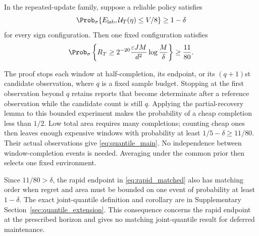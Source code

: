 \begin{theorem}
\label{thm:quantile_main}
In the repeated-update family, suppose a reliable policy satisfies
\[
 \Prob_\sigma\{E_{\rm lab},\mathcal U_T(\eta)\le V/8\}\ge1-\delta
\]
for every sign configuration. Then one fixed configuration satisfies
\begin{equation}
 \Prob_\sigma\left\{R_T\ge
 2^{-20}\frac{\varepsilon JM}{d^2}\log\frac M\delta\right\}
 \ge\frac{11}{80}.
 \label{eq:quantile_main}
\end{equation}
\end{theorem}

The proof stops each window at half-completion, its endpoint, or its
$(q+1)$st candidate observation, where $q$ is a fixed sample budget. Stopping
at the first observation beyond $q$ retains reports that become determinate
after a reference observation while the candidate count is still $q$.
Applying the partial-recovery lemma to this bounded experiment makes the
probability of a cheap completion less than $1/2$. Low total area requires
many completions; counting cheap ones then leaves enough expensive windows
with probability at least $1/5-\delta\ge11/80$. Their actual observations
give \eqref{eq:quantile_main}. No independence between window-completion
events is needed. Averaging under the common prior then selects one fixed
environment.

Since $11/80>\delta$, the rapid endpoint in \eqref{eq:rapid_matched} also
has matching order when regret and area must be bounded on one event of
probability at least $1-\delta$. The exact joint-quantile definition and
corollary are in Supplementary Section~\ref{sec:quantile_extension}. This
consequence concerns the rapid endpoint at the prescribed horizon and gives
no matching joint-quantile result for deferred maintenance.
